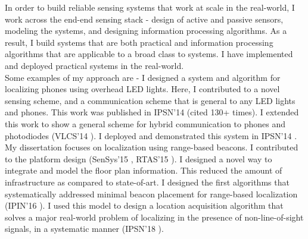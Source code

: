 \documentclass[10pt]{article}
\begin{document}
In order to build reliable sensing systems that work at scale in the real-world, I work across the end-end sensing stack - design of active and passive sensors, modeling the systems, and designing information processing algorithms. As a result, I build systems that are both practical and information processing algorithms that are applicable to a broad class to systems. I have implemented and deployed practical systems in the real-world.\\


Some examples of my approach are - I designed a system and algorithm for localizing phones using overhead LED lights. Here, I contributed to a novel sensing scheme, and a communication scheme that is general to any LED lights and phones. This work was published in IPSN'14\cite{rajagopal2014visual}
(cited 130+ times). I extended this work to show a general scheme for hybrid communication to phones and photodiodes (VLCS'14 \cite{rajagopal2014hybrid}). I deployed and demonstrated this system in IPSN'14 \cite{rajagopal2014demonstration}. My dissertation focuses on localization using range-based beacons. I contributed to the platform design (SenSys'15 \cite{lazik2015alps},
RTAS'15 \cite{rtas-alps-platform}). I designed a novel way to integrate and model the floor plan information. This reduced the amount of infrastructure as compared to state-of-art. I designed the first algorithms that systematically addressed minimal beacon placement for range-based localization (IPIN'16 \cite{rajagopal2016beacon}). I used this model to design a location acquisition algorithm that solves a major real-world problem of localizing in the presence of non-line-of-sight signals, in a systematic manner (IPSN'18 \cite{rajagopal2018enhancing}). 
\end{document}
